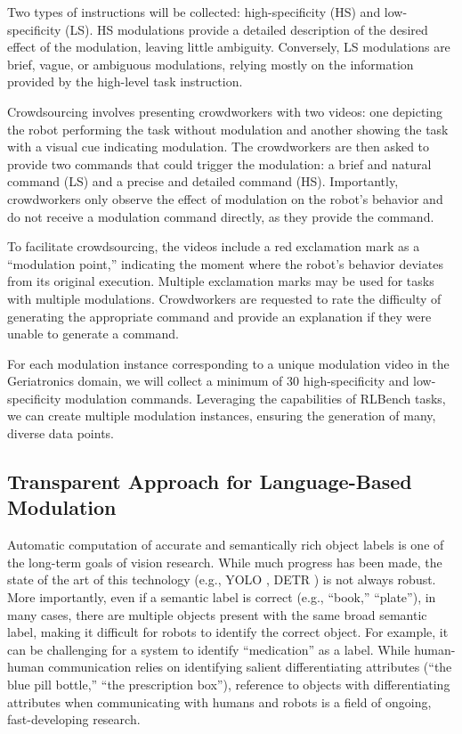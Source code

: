 \documentclass[journal]{IEEEtran}
\begin{document}
Two types of instructions will be collected: high-specificity 
(HS) and low-specificity (LS). HS modulations provide a detailed 
description of the desired effect of the modulation, leaving 
little ambiguity. Conversely, LS modulations are brief, vague, 
or ambiguous modulations, relying mostly on the information 
provided by the high-level task instruction. 

Crowdsourcing involves presenting crowdworkers with two videos: 
one depicting the robot performing the task without modulation 
and another showing the task with a visual cue indicating modulation.
The crowdworkers are then asked to provide two commands that 
could trigger the modulation: a brief and natural command (LS) 
and a precise and detailed command (HS). Importantly, 
crowdworkers only observe the effect of modulation on 
the robot's behavior and do not receive a modulation 
command directly, as they provide the command.

To facilitate crowdsourcing, the videos include a red exclamation 
mark as a ``modulation point,'' indicating the moment where the 
robot's behavior deviates from its original execution. 
Multiple exclamation marks may be used for tasks with multiple 
modulations. Crowdworkers are requested to rate the difficulty of 
generating the appropriate command and provide an explanation if 
they were unable to generate a command.

For each modulation instance corresponding to a unique modulation 
video in the Geriatronics domain, we will collect a minimum of 30 
high-specificity and low-specificity modulation commands. Leveraging
the capabilities of RLBench tasks, we can create multiple modulation
instances, ensuring the generation of many, diverse data points.

\subsection{Transparent Approach for Language-Based Modulation}

Automatic computation of accurate and semantically rich object
labels is one of the long-term goals of vision research. 
While much progress has been made, the state of the art of 
this technology (e.g., YOLO \cite{wang2022yolo}, DETR 
\cite{carion2020detr}) is not always robust. 
More importantly, even if a semantic label is correct 
(e.g., ``book,'' ``plate''), in many cases, there are multiple
objects present with the same broad semantic label, making
it difficult for robots to identify the correct object. 
For example, it can be challenging for a system to identify 
``medication'' as a label. While human-human communication 
relies on identifying salient differentiating attributes 
(``the blue pill bottle,'' ``the prescription box''), reference to 
objects with differentiating attributes when communicating with 
humans and robots is a field of ongoing, fast-developing research.
\end{document}
